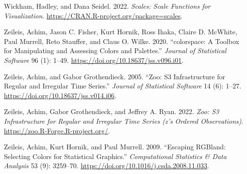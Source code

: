 \documentclass[
]{article}
\newlength{\cslhangindent}
\newlength{\cslentryspacingunit} %
\newenvironment{CSLReferences}[2] %
 {%
  \setlength{\parindent}{0pt}
  \ifodd #1
  \let\oldpar\par
  \def\par{\hangindent=\cslhangindent\oldpar}
  \fi
  \setlength{\parskip}{#2\cslentryspacingunit}
 }%
 {}
\begin{document}
\begin{CSLReferences}{1}{0}
\leavevmode{}%
Wickham, Hadley, and Dana Seidel. 2022. \emph{Scales: Scale Functions
for Visualization}. \url{https://CRAN.R-project.org/package=scales}.

\leavevmode{}%
Zeileis, Achim, Jason C. Fisher, Kurt Hornik, Ross Ihaka, Claire D.
McWhite, Paul Murrell, Reto Stauffer, and Claus O. Wilke. 2020.
{``{colorspace}: A Toolbox for Manipulating and Assessing Colors and
Palettes.''} \emph{Journal of Statistical Software} 96 (1): 1--49.
\url{https://doi.org/10.18637/jss.v096.i01}.

\leavevmode{}%
Zeileis, Achim, and Gabor Grothendieck. 2005. {``Zoo: S3 Infrastructure
for Regular and Irregular Time Series.''} \emph{Journal of Statistical
Software} 14 (6): 1--27. \url{https://doi.org/10.18637/jss.v014.i06}.

\leavevmode{}%
Zeileis, Achim, Gabor Grothendieck, and Jeffrey A. Ryan. 2022.
\emph{Zoo: S3 Infrastructure for Regular and Irregular Time Series (z's
Ordered Observations)}. \url{https://zoo.R-Forge.R-project.org/}.

\leavevmode{}%
Zeileis, Achim, Kurt Hornik, and Paul Murrell. 2009. {``Escaping
{RGB}land: Selecting Colors for Statistical Graphics.''}
\emph{Computational Statistics \& Data Analysis} 53 (9): 3259--70.
\url{https://doi.org/10.1016/j.csda.2008.11.033}.

\end{CSLReferences}
\end{document}
